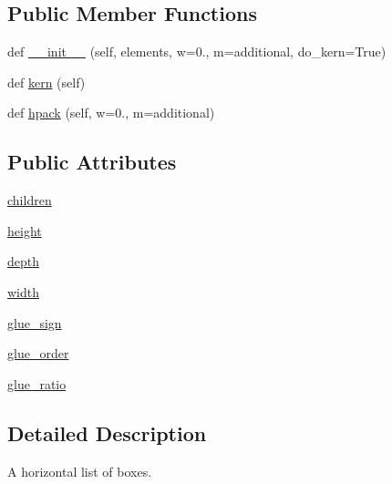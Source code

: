 \subsection*{Public Member Functions}
\begin{DoxyCompactItemize}
\item 
def \hyperlink{classmatplotlib_1_1__mathtext_1_1Hlist_ad694997f98a3982e10e2cc9d2ad157ad}{\+\_\+\+\_\+init\+\_\+\+\_\+} (self, elements, w=0., m=\textquotesingle{}additional\textquotesingle{}, do\+\_\+kern=True)
\item 
def \hyperlink{classmatplotlib_1_1__mathtext_1_1Hlist_aa838918fbf306f588ba975a06bbb44b3}{kern} (self)
\item 
def \hyperlink{classmatplotlib_1_1__mathtext_1_1Hlist_a45f4dc8384318cb753ed86078e85ff9f}{hpack} (self, w=0., m=\textquotesingle{}additional\textquotesingle{})
\end{DoxyCompactItemize}
\subsection*{Public Attributes}
\begin{DoxyCompactItemize}
\item 
\hyperlink{classmatplotlib_1_1__mathtext_1_1Hlist_ae2d53be50f7aeb8a5e5764316b0caa2f}{children}
\item 
\hyperlink{classmatplotlib_1_1__mathtext_1_1Hlist_ad4da62a3f586721d3ff2fd30c5f43705}{height}
\item 
\hyperlink{classmatplotlib_1_1__mathtext_1_1Hlist_a349cf825e904929d3b410c4e46fe20a9}{depth}
\item 
\hyperlink{classmatplotlib_1_1__mathtext_1_1Hlist_ab163b65ac3c9be176cce2bcb6c591ef9}{width}
\item 
\hyperlink{classmatplotlib_1_1__mathtext_1_1Hlist_a93d92aa88913c8dd9f514d8d5daa36f8}{glue\+\_\+sign}
\item 
\hyperlink{classmatplotlib_1_1__mathtext_1_1Hlist_a9bc48a6e8c325df8fbf4b1dec2e8f3f3}{glue\+\_\+order}
\item 
\hyperlink{classmatplotlib_1_1__mathtext_1_1Hlist_ad61fce1d51d2925fd31e53656789b4e3}{glue\+\_\+ratio}
\end{DoxyCompactItemize}


\subsection{Detailed Description}
\begin{DoxyVerb}A horizontal list of boxes.\end{DoxyVerb}
 

